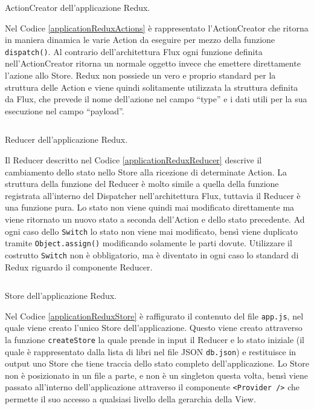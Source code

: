 \begin{listing}[ht]
\inputminted{javascript}{sources/applicationReduxActions.js}
\caption{ActionCreator dell'applicazione Redux.} 
\label{applicationReduxActions} 
\end{listing}

Nel Codice \ref{applicationReduxActions} è rappresentato l'ActionCreator che ritorna in maniera dinamica le varie Action da eseguire per mezzo della funzione \texttt{dispatch()}. Al contrario dell'architettura Flux ogni funzione definita nell'ActionCreator ritorna un normale oggetto invece che emettere direttamente l'azione allo Store.
Redux non possiede un vero e proprio standard per la struttura delle Action e viene quindi solitamente utilizzata la struttura definita da Flux, che prevede il nome dell'azione nel campo “type” e i dati utili per la sua esecuzione nel campo “payload”.

\begin{listing}[ht]
\inputminted{javascript}{sources/applicationReduxReducer.js}
\caption{Reducer dell'applicazione Redux.} 
\label{applicationReduxReducer} 
\end{listing}

Il Reducer descritto nel Codice \ref{applicationReduxReducer} descrive il cambiamento dello stato nello Store alla ricezione di determinate Action. La struttura della funzione del Reducer è molto simile a quella della funzione registrata all'interno del Dispatcher nell'architettura Flux, tuttavia il Reducer è una funzione pura. Lo stato non viene quindi mai modificato direttamente ma viene ritornato un nuovo stato a seconda dell'Action e dello stato precedente.
Ad ogni caso dello \texttt{Switch} lo stato non viene mai modificato, bensì viene duplicato tramite \texttt{Object.assign()} modificando solamente le parti dovute.
Utilizzare il costrutto \texttt{Switch} non è obbligatorio, ma è diventato in ogni caso lo standard di Redux riguardo il componente Reducer. 

\begin{listing}[ht]
\inputminted{javascript}{sources/applicationReduxStore.js}
\caption{Store dell'applicazione Redux.} 
\label{applicationReduxStore} 
\end{listing}

Nel Codice \ref{applicationReduxStore} è raffigurato il contenuto del file \texttt{app.js}, nel quale viene creato l'unico Store dell'applicazione. Questo viene creato attraverso
la funzione \texttt{createStore} la quale prende in input il Reducer e lo stato iniziale (il quale è rappresentato dalla lista di libri nel file JSON \texttt{db.json}) e restituisce in output uno Store che tiene traccia dello stato completo dell'applicazione.
Lo Store non è posizionato in un file a parte, e non è un singleton questa volta, bensì viene passato all'interno dell'applicazione attraverso il componente \texttt{<Provider />} che permette il suo accesso a qualsiasi livello della gerarchia della View.

